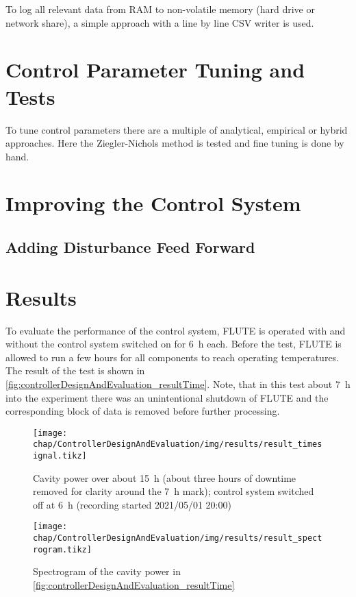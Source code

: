 To log all relevant data from RAM to non-volatile memory (hard drive or network share), a simple approach with a line by line CSV writer is used.


\section{Control Parameter Tuning and Tests}
To tune control parameters there are a multiple of analytical, empirical or hybrid approaches. Here the Ziegler-Nichols method is tested and fine tuning is done by hand.

\section{Improving the Control System}

\subsection{Adding Disturbance Feed Forward}


\newpage
\section{Results}
To evaluate the performance of the control system, FLUTE is operated with and without the control system switched on for \SI{6}{\hour} each.
Before the test, FLUTE is allowed to run a few hours for all components to reach operating temperatures.
The result of the test is shown in \autoref{fig:controllerDesignAndEvaluation_resultTime}.
Note, that in this test about \SI{7}{\hour} into the experiment there was an unintentional shutdown of FLUTE and the corresponding block of data is removed before further processing.

\begin{figure}[tbh]
	\centering
	\texttt{[image: chap/ControllerDesignAndEvaluation/img/results/result\_timesignal.tikz]}
	\caption{Cavity power over about \SI{15}{\hour} (about three hours of downtime removed for clarity around the \SI{7}{\hour} mark); control system switched off at \SI{6}{\hour} (recording started 2021/05/01 20:00)}
	\label{fig:controllerDesignAndEvaluation_resultTime}
\end{figure}

\begin{figure}[tbh]
	\centering
	\texttt{[image: chap/ControllerDesignAndEvaluation/img/results/result\_spectrogram.tikz]}
	\caption{Spectrogram of the cavity power in \autoref{fig:controllerDesignAndEvaluation_resultTime}}
	\label{fig:controllerDesignAndEvaluation_resultSpectg}
\end{figure}

